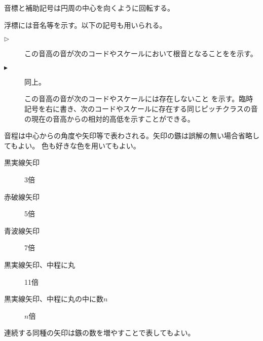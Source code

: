 \documentclass[b5]{ltjsbook}
\newcommand{\ket}[1]{\left|#1\right\rangle}
\begin{document}
音標と補助記号は円周の中心を向くように回転する。

浮標には音名等を示す。以下の記号も用いられる。

\begin{description}
\item[$\triangleright$] この音高の音が次のコードやスケールにおいて根音となることをを示す。
\item[$\blacktriangleright$] 同上。
\item[] この音高の音が次のコードやスケールには存在しないこと
  を示す。臨時記号を右に書き、次のコードやスケールに存在する同じピッチクラスの音
  の現在の音高からの相対的高低を示すことができる。
\end{description}

音程は中心からの角度や矢印等で表わされる。矢印の鏃は誤解の無い場合省略してもよい。
色も好きな色を用いてもよい。
\begin{description}
\item[黒実線矢印] 3倍
\item[赤破線矢印] 5倍
\item[青波線矢印] 7倍
\item[黒実線矢印、中程に丸] 11倍
\item[黒実線矢印、中程に丸の中に数$n$] $n$倍
\end{description}

連続する同種の矢印は鏃の数を増やすことで表してもよい。


\end{document}
